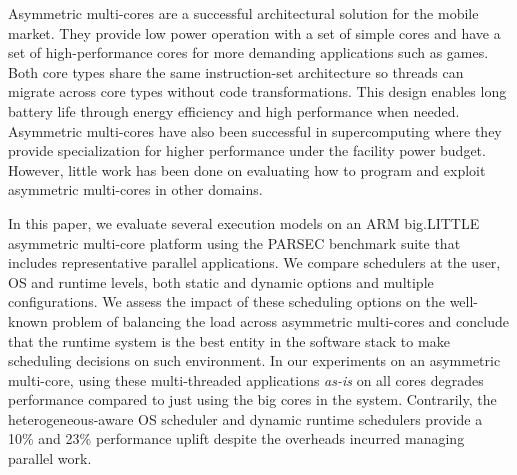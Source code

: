 Asymmetric multi-cores are a successful architectural solution for the mobile 
market. They provide low power operation with a set of simple  
cores and have a set of high-performance cores for more demanding applications 
such as games. Both core types share the same instruction-set architecture so 
threads can migrate across core types without code transformations. This design 
enables long battery life through energy efficiency and high performance when 
needed. Asymmetric multi-cores have also been successful in supercomputing where
they provide specialization for higher performance under the facility power budget. 
However, little work has been done on evaluating how to program and exploit 
asymmetric multi-cores in other domains. 

In this paper, we evaluate several execution models on an ARM 
big.LITTLE asymmetric multi-core platform using the PARSEC benchmark suite that 
includes representative parallel applications. We compare schedulers at 
the user, OS and runtime levels, both static and dynamic options and multiple 
configurations. We assess the impact of these scheduling options on the 
well-known problem of balancing the load across asymmetric multi-cores and 
conclude that the runtime system is the best entity in the software stack to 
make scheduling decisions on such environment. In our experiments on an 
asymmetric multi-core, using these multi-threaded applications \textit{as-is} on all
cores degrades performance compared to just using the big cores in the system.  
Contrarily, the heterogeneous-aware OS scheduler and dynamic 
runtime schedulers provide a 10\% and 23\% performance uplift despite the 
overheads incurred managing parallel work.




